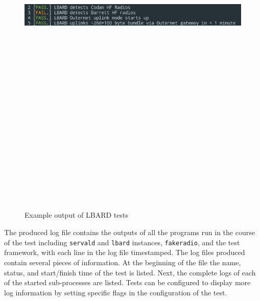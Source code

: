 \begin{figure}
    \begin{centering}
        \includegraphics[width=14cm,height=20cm,keepaspectratio]{Figures/testOutput1.png}
        \caption{Example output of LBARD tests}
        \label{fig:exampleTest}
    \end{centering}
\end{figure}

The produced log file contains the outputs of all the programs run in the course of the test including \texttt{servald} and \texttt{lbard} instances, \texttt{fakeradio}, and the test framework, with each line in the log file timestamped.
The log files produced contain several pieces of information.
At the beginning of the file the name, status, and start/finish time of the test is listed.
Next, the complete logs of each of the started sub-processes are listed.
Tests can be configured to display more log information by setting specific flags in the configuration of the test.


